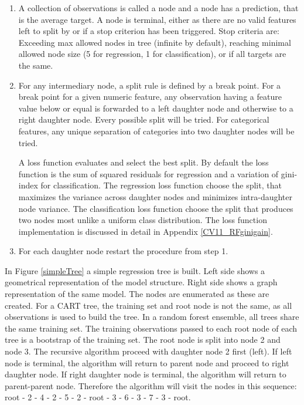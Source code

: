 \begin{enumerate}  
\item A collection of observations is called a node and a node has a prediction, that is the average target. A node is terminal, either as there are no valid features left to split by or if a stop criterion has been triggered. Stop criteria are: Exceeding max allowed nodes in tree (infinite by default), reaching minimal allowed node size (5 for regression, 1 for classification), or if all targets are the same.

\item For any intermediary node, a split rule is defined by a break point. For a break point for a given numeric feature, any observation having a feature value below or equal is forwarded to a left daughter node and otherwise to a right daughter node. Every possible split will be tried. For categorical features, any unique separation of categories into two daughter nodes will be tried.

A loss function evaluates and select the best split. By default the loss function is the sum of squared residuals for regression and a variation of gini-index for classification. The regression loss function choose the split, that maximizes the variance across daughter nodes and minimizes intra-daughter node variance. The classification loss function choose the split that produces two nodes most unlike a uniform class distribution. The loss function implementation is discussed in detail in Appendix \ref{CV11_RFginigain}.

\item For each daughter node restart the procedure from step 1.

\end{enumerate}

In Figure \ref{simpleTree} a simple regression tree is built. Left side shows a geometrical representation of the model structure. Right side shows a graph representation of the same model. The nodes are enumerated as these are created. For a CART tree, the training set and root node is not the same, as all observations is used to build the tree. In a random forest ensemble, all trees share the same training set. The training observations passed to each root node of each tree is a bootstrap of the training set. The root node is split into node 2 and node 3. The recursive algorithm proceed with daughter node 2 first (left). If left node is terminal, the algorithm will return to parent node and proceed to right daughter node. If right daughter node is terminal, the algorithm will return to parent-parent node. Therefore the algorithm will visit the nodes in this sequence: root - 2 - 4 - 2 - 5 - 2 - root - 3 - 6 - 3 - 7 - 3 - root.

